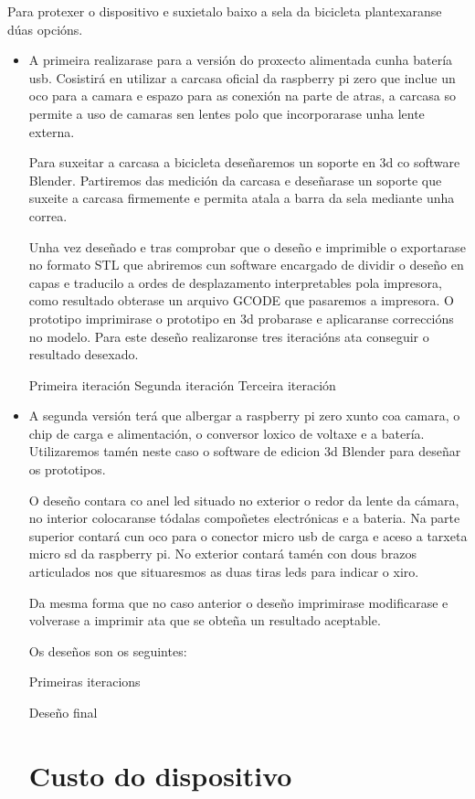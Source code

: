 Para protexer o dispositivo e suxietalo baixo a sela da bicicleta plantexaranse dúas opcións.
\begin{itemize}
    \item A primeira realizarase para a versión do proxecto alimentada cunha batería usb. Cosistirá en utilizar a carcasa oficial da raspberry pi zero que inclue un oco para a camara e espazo para as conexión na parte de atras, a carcasa so permite a uso de camaras sen lentes polo que incorporarase unha lente externa.

    Para suxeitar a carcasa a bicicleta deseñaremos un soporte en 3d co software Blender. Partiremos das medición da carcasa e deseñarase un soporte que suxeite a carcasa firmemente e permita atala a barra da sela mediante unha correa.

    Unha vez deseñado e tras comprobar que o deseño e imprimible o exportarase no formato STL que abriremos cun software encargado de dividir o deseño en capas e traducilo a ordes de desplazamento interpretables pola impresora, como resultado obterase un arquivo GCODE que pasaremos a impresora. O prototipo imprimirase o prototipo en 3d probarase e aplicaranse correccións no modelo. Para este deseño realizaronse tres iteracións ata conseguir o resultado desexado.

    Primeira iteración
    Segunda iteración
    Terceira iteración

    \item A segunda versión terá que albergar a raspberry pi zero xunto coa camara, o chip de carga e alimentación, o conversor loxico de voltaxe e a batería. Utilizaremos tamén neste caso o software de edicion 3d Blender para deseñar os prototipos.

    O deseño contara co anel led situado no exterior o redor da lente da cámara, no interior colocaranse tódalas compoñetes electrónicas e a bateria. Na parte superior contará cun oco para o conector micro usb de carga e aceso a tarxeta micro sd da raspberry pi. No exterior contará tamén con dous brazos articulados nos que situaresmos as duas tiras leds para indicar o xiro.

    Da mesma forma que no caso anterior o deseño imprimirase modificarase e volverase a imprimir ata que se obteña un resultado aceptable.

    Os deseños son os seguintes:

    Primeiras iteracions

    Deseño final

    \section{Custo do dispositivo}

\end{itemize}
